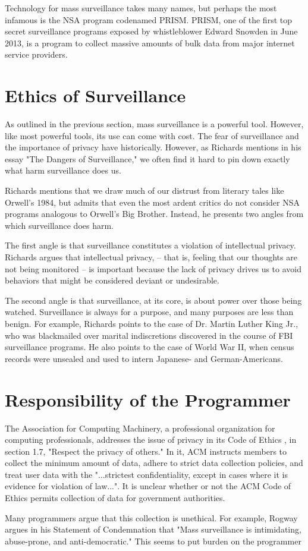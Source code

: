 \documentclass{sig-alternate-05-2015}
\begin{document}
Technology for mass surveillance takes many names, but perhaps the most
infamous is the NSA program codenamed PRISM. PRISM, one of the first top secret
surveillance programs exposed by whistleblower Edward Snowden in June 2013, is
a program to collect massive amounts of bulk data from major internet service
providers. 

\section{Ethics of Surveillance}
As outlined in the previous section, mass surveillance is a powerful tool.
However, like most powerful tools, its use can come with cost. The fear of
surveillance and the importance of privacy have historically. However, as
Richards mentions in his essay "The Dangers of Surveillance,"\cite{richards} 
we often find it hard to pin down exactly what harm surveillance does us.

Richards mentions that we draw much of our distrust from literary tales like
Orwell's 1984, but admits that even the most ardent critics do not consider NSA
programs analogous to Orwell's Big Brother. Instead, he presents two angles
from which surveillance does harm. 

The first angle is that surveillance constitutes a violation of intellectual
privacy. Richards argues that intellectual privacy, -- that is, feeling that
our thoughts are not being monitored -- is important because the lack of
privacy drives us to avoid behaviors that might be considered deviant or
undesirable.

The second angle is that surveillance, at its core, is about power over those
being watched. Surveillance is always for a purpose, and many purposes are less
than benign. For example, Richards points to the case of Dr. Martin Luther King
Jr., who was blackmailed over marital indiscretions discovered in the course of
FBI surveillance programs. He also points to the case of World War II, when
census records were unsealed and used to intern Japanese- and German-Americans.



\section{Responsibility of the Programmer}
The Association for Computing Machinery, a professional organization for
computing professionals, addresses the issue of privacy in its Code of
Ethics \cite{ethics}, in section 1.7, "Respect the privacy of others." In it,
ACM instructs members to collect the minimum amount of data, adhere to strict
data collection policies, and treat user data with the "...strictest
confidentiality, except in cases where it is evidence for violation of law...".
It is unclear whether or not the ACM Code of Ethics permits collection of data
for government authorities.

Many programmers argue that this collection is unethical. For example, Rogway
argues in his Statement of Condemnation \cite{rogway} that "Mass surveillance
is intimidating, abuse-prone, and anti-democratic." This seems to put burden on
the programmer 



\end{document}
